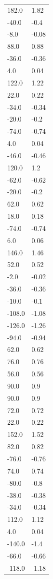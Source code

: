 \begin{longtable}{ll}
182.0 & 1.82 \\
-40.0 & -0.4 \\
-8.0 & -0.08 \\
88.0 & 0.88 \\
-36.0 & -0.36 \\
4.0 & 0.04 \\
122.0 & 1.22 \\
22.0 & 0.22 \\
-34.0 & -0.34 \\
-20.0 & -0.2 \\
-74.0 & -0.74 \\
4.0 & 0.04 \\
-46.0 & -0.46 \\
120.0 & 1.2 \\
-62.0 & -0.62 \\
-20.0 & -0.2 \\
62.0 & 0.62 \\
18.0 & 0.18 \\
-74.0 & -0.74 \\
6.0 & 0.06 \\
146.0 & 1.46 \\
52.0 & 0.52 \\
-2.0 & -0.02 \\
-36.0 & -0.36 \\
-10.0 & -0.1 \\
-108.0 & -1.08 \\
-126.0 & -1.26 \\
-94.0 & -0.94 \\
62.0 & 0.62 \\
76.0 & 0.76 \\
56.0 & 0.56 \\
90.0 & 0.9 \\
90.0 & 0.9 \\
72.0 & 0.72 \\
22.0 & 0.22 \\
152.0 & 1.52 \\
82.0 & 0.82 \\
-76.0 & -0.76 \\
74.0 & 0.74 \\
-80.0 & -0.8 \\
-38.0 & -0.38 \\
-34.0 & -0.34 \\
112.0 & 1.12 \\
4.0 & 0.04 \\
-140.0 & -1.4 \\
-66.0 & -0.66 \\
-118.0 & -1.18 \\

\end{longtable}
